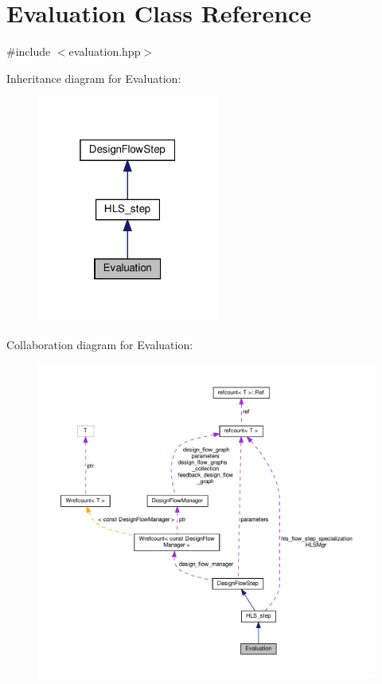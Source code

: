 \hypertarget{classEvaluation}{}\section{Evaluation Class Reference}
\label{classEvaluation}


{\ttfamily \#include $<$evaluation.\+hpp$>$}



Inheritance diagram for Evaluation\+:
\nopagebreak
\begin{figure}[H]
\begin{center}
\leavevmode
\includegraphics[width=169pt]{dd/dc6/classEvaluation__inherit__graph}
\end{center}
\end{figure}


Collaboration diagram for Evaluation\+:
\nopagebreak
\begin{figure}[H]
\begin{center}
\leavevmode
\includegraphics[width=350pt]{d4/d14/classEvaluation__coll__graph}
\end{center}
\end{figure}
